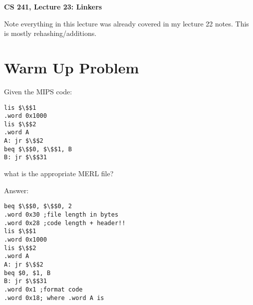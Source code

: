 \documentclass[12pt]{article}
\author{Clement Tsang}
\begin{document}
\begin{center}
\Large\textbf{CS 241, Lecture 23: Linkers}
\end{center}

Note everything in this lecture was already covered in my lecture 22 notes.  This is mostly rehashing/additions.

\section{Warm Up Problem}
Given the MIPS code:
\begin{lstlisting}[mathescape, numbers=none, breaklines=true]
lis $\$$1
.word 0x1000
lis $\$$2
.word A
A: jr $\$$2
beq $\$$0, $\$$1, B
B: jr $\$$31
\end{lstlisting}
what is the appropriate MERL file?

Answer:
\begin{lstlisting}[mathescape, numbers=none, breaklines=true]
beq $\$$0, $\$$0, 2
.word 0x30 ;file length in bytes
.word 0x28 ;code length + header!!
lis $\$$1
.word 0x1000
lis $\$$2
.word A
A: jr $\$$2
beq $0, $1, B
B: jr $\$$31
.word 0x1 ;format code
.word 0x18; where .word A is
\end{lstlisting}
\end{document}
